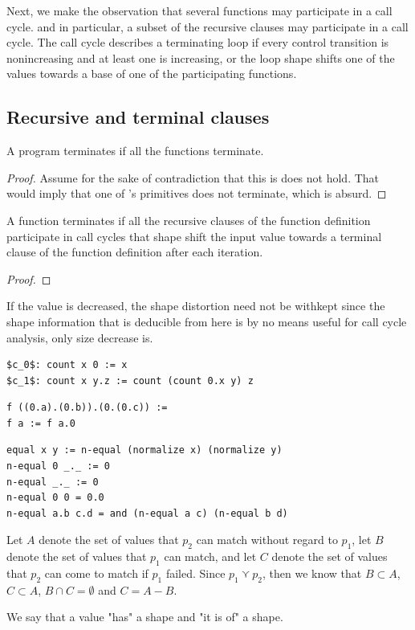 Next, we make the observation that several functions may participate in a call
cycle.  and in particular, a subset of the recursive clauses may participate in
a call cycle. The call cycle describes a terminating loop if every control
transition is nonincreasing and at least one is increasing, or the loop shape
shifts one of the values towards a base of one of the participating functions.

\subsection{Recursive and terminal clauses}

\begin{lemma}
A program terminates if all the functions terminate.
\end{lemma}

\begin{proof} Assume for the sake of contradiction that this is does not hold.
That would imply that one of \D{}'s primitives does not terminate, which is
absurd.  \end{proof}

\begin{lemma} A function terminates if all the recursive clauses of the
function definition participate in call cycles that shape shift the input value
towards a terminal clause of the function definition after each iteration.
\end{lemma}

\begin{proof}

\end{proof}


If the value is decreased, the shape distortion need not be withkept since the
shape information that is deducible from here is by no means useful for call
cycle analysis, only size decrease is.

\begin{lstlisting}
$c_0$: count x 0 := x
$c_1$: count x y.z := count (count 0.x y) z
\end{lstlisting}

\begin{lstlisting}
f ((0.a).(0.b)).(0.(0.c)) := 
f a := f a.0
\end{lstlisting}

\begin{verbatim}
equal x y := n-equal (normalize x) (normalize y)
n-equal 0 _._ := 0
n-equal _._ := 0
n-equal 0 0 = 0.0
n-equal a.b c.d = and (n-equal a c) (n-equal b d)
\end{verbatim}

Let $A$ denote the set of values that $p_2$ can
match without regard to $p_1$, let $B$ denote the set of values that $p_1$ can
match, and let $C$ denote the set of values that $p_2$ can come to match if
$p_1$ failed. Since $p_1\curlyvee p_2$, then we know that $B\subset A$,
$C\subset A$, $B\cap C=\emptyset$ and $C=A-B$.



We say that a value "has" a shape and "it is of" a shape.
